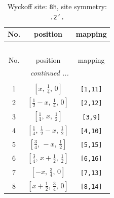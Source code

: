 \documentclass[fleqn,8pt]{jsarticle}
\begin{document}
\begin{longtable}{ccc}
\caption{Wyckoff site: {\tt 8h}, site symmetry: {\tt .2'.}}
 \\
 \hline \hline
No. & position & mapping \\ \hline \endfirsthead

\multicolumn{2}{l}{\tablename\ \thetable{}} \\
 \hline \hline
No. & position & mapping \\ \hline \endhead

 \hline \hline
\multicolumn{2}{r}{\footnotesize\it continued ...} \\ \endfoot

 \hline \hline
\multicolumn{2}{r}{} \\ \endlastfoot

1 & $\left[ x,\, \frac{1}{4},\, 0 \right]$ & {\tt [1,11]} \\ \hline
2 & $\left[ \frac{1}{2} - x,\, \frac{1}{4},\, 0 \right]$ & {\tt [2,12]} \\ \hline
3 & $\left[ \frac{1}{4},\, x,\, \frac{1}{2} \right]$ & {\tt [3,9]} \\ \hline
4 & $\left[ \frac{1}{4},\, \frac{1}{2} - x,\, \frac{1}{2} \right]$ & {\tt [4,10]} \\ \hline
5 & $\left[ \frac{3}{4},\, - x,\, \frac{1}{2} \right]$ & {\tt [5,15]} \\ \hline
6 & $\left[ \frac{3}{4},\, x + \frac{1}{2},\, \frac{1}{2} \right]$ & {\tt [6,16]} \\ \hline
7 & $\left[ - x,\, \frac{3}{4},\, 0 \right]$ & {\tt [7,13]} \\ \hline
8 & $\left[ x + \frac{1}{2},\, \frac{3}{4},\, 0 \right]$ & {\tt [8,14]} \\
\end{longtable}
\renewcommand{\arraystretch}{1.2}
\end{document}
